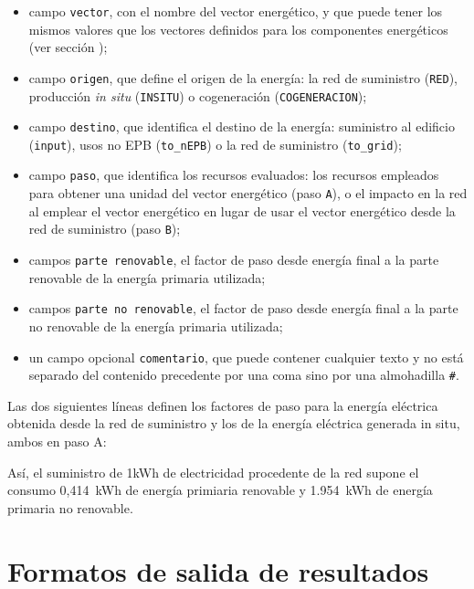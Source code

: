 \documentclass[10pt,notitlepage,oneside,a4paper]{article}
\begin{document}
\begin{itemize}
\item campo \texttt{vector}, con el nombre del vector energético, y que puede tener los mismos valores que los vectores definidos para los componentes energéticos (ver sección );
\item campo \texttt{origen}, que define el origen de la energía: la red de suministro (\texttt{RED}), producción \textit{in situ} (\texttt{INSITU}) o cogeneración (\texttt{COGENERACION});
\item campo \texttt{destino}, que identifica el destino de la energía: suministro al edificio (\texttt{input}), usos no EPB (\texttt{to\_nEPB}) o la red de suministro (\texttt{to\_grid});
\item campo \texttt{paso}, que identifica los recursos evaluados: los recursos empleados para obtener una unidad del vector energético (paso \texttt{A}), o el impacto en la red al emplear el vector energético en lugar de usar el vector energético desde la red de suministro (paso \texttt{B});
\item campos \texttt{parte renovable}, el factor de paso desde energía final a la parte renovable de la energía primaria utilizada;
\item campos \texttt{parte no renovable}, el factor de paso desde energía final a la parte no renovable de la energía primaria utilizada;
\item un campo opcional \texttt{comentario}, que puede contener cualquier texto y no está separado del contenido precedente por una coma sino por una almohadilla \texttt{\#}.
\end{itemize}

Las dos siguientes líneas definen los factores de paso para la energía eléctrica obtenida desde la red de suministro y los de la energía eléctrica generada in situ, ambos en paso A:



Así, el suministro de 1kWh de electricidad procedente de la red supone el consumo 0,414~kWh de energía primiaria renovable y 1.954~kWh de energía primaria no renovable.

\clearpage
\newpage
\section{Formatos de salida de resultados}\label{sec:formatosalida}
\end{document}
